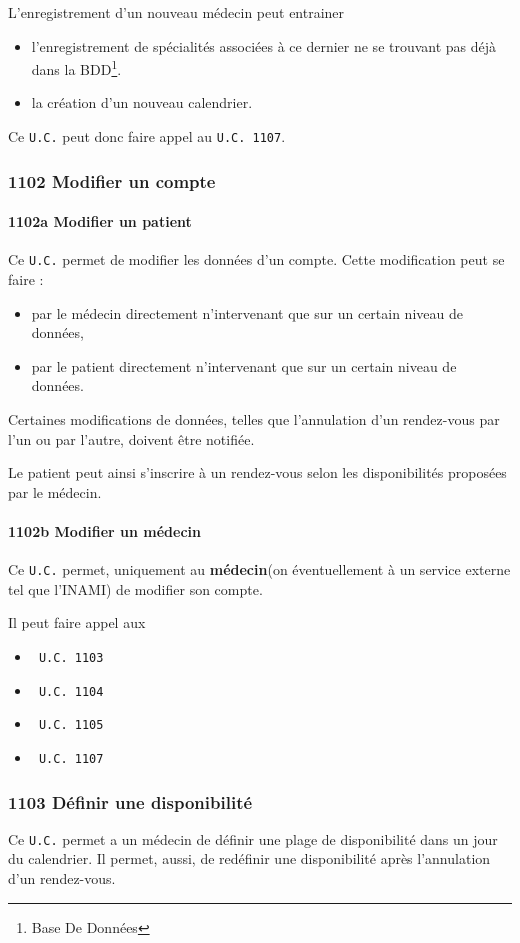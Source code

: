 \documentclass[a4paper, 11pt]{report}
\begin{document}
L'enregistrement d'un nouveau médecin peut entrainer 
\begin{itemize}
	\item l'enregistrement de	spécialités associées à ce dernier ne se trouvant pas déjà dans la 
		BDD\footnote{Base De Données}.
	\item la création d'un nouveau calendrier.
\end{itemize}
Ce \texttt{U.C.} peut donc faire appel au \texttt{U.C. 1107}.
\subsubsection{1102 Modifier un compte}

\paragraph{1102a Modifier un patient}
Ce \texttt{U.C.} permet de modifier les données d'un compte. Cette modification
peut se faire :
\begin{itemize}
	\item par le médecin directement n'intervenant que sur un certain niveau de
		données,
	\item par le patient directement n'intervenant que sur un certain niveau de
		données.
\end{itemize}

Certaines modifications de données, telles que l'annulation d'un rendez-vous par
l'un ou par l'autre, doivent être notifiée.

Le patient peut ainsi s'inscrire à un rendez-vous selon les disponibilités
proposées par le médecin.
\paragraph{1102b Modifier un médecin}
Ce \texttt{U.C.} permet, uniquement au \textbf{médecin}(on éventuellement à un
service externe tel que l'INAMI) de modifier son compte.

Il peut faire appel aux 
\begin{itemize}
	\item \texttt{~U.C. 1103} 
	\item \texttt{~U.C. 1104} 
	\item \texttt{~U.C. 1105}
	\item \texttt{~U.C. 1107}
\end{itemize}

\subsubsection{\label{1103}1103 Définir une disponibilité}
Ce \texttt{U.C.} permet a un médecin de définir une plage de disponibilité dans
un jour du calendrier. Il permet, aussi, de redéfinir une disponibilité après
l'annulation d'un rendez-vous.
\end{document}
